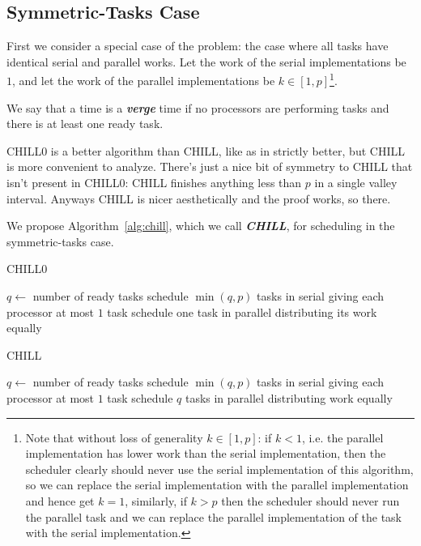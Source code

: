 \documentclass[twocolumn]{article}[11pt]
\newcommand{\defn}[1]{{\textit{\textbf{\boldmath #1}}}\xspace}
\begin{document}
\subsection{Symmetric-Tasks Case}
\label{subsec:symmetrictasks}
First we consider a special case of the problem: the case where
all tasks have identical serial and parallel works. Let
the work of the serial implementations be $1$, and let the work
of the parallel implementations be $k \in [1, p]$\footnote{Note that
without loss of generality $k \in [1,p]$: if $k < 1$, i.e. the
parallel implementation has lower work than the serial
implementation, then the scheduler clearly should never use the serial
implementation of this algorithm, so we can replace the serial
implementation with the parallel implementation and hence get
$k=1$, similarly, if $k > p$ then the scheduler should never run
the parallel task and we can replace the parallel implementation
of the task with the serial implementation.}.

We say that a time is a \defn{verge} time if no processors are
performing tasks and there is at least one ready task.

{\color{red}
  CHILL0 is a better algorithm than CHILL, like as in strictly
  better, but CHILL is more convenient to analyze. There's just a
  nice bit of symmetry to CHILL that isn't present in CHILL0:
  CHILL finishes anything less than $p$ in a single valley
  interval. Anyways CHILL is nicer aesthetically and the proof
  works, so there. 
}

We propose Algorithm~\ref{alg:chill}, which we call \defn{CHILL},
for scheduling in the symmetric-tasks case.

\begin{algorithm}
  \caption{CHILL0}
  \label{alg:chill0}
  \begin{algorithmic}
        \State $q \gets $ number of ready tasks
          \State schedule $\min(q, p)$ tasks in serial
          \State giving each processor at most $1$ task
        \Else
          \State schedule one task in parallel
          \State distributing its work equally 
        \EndIf
      \EndIf
    \EndWhile
  \end{algorithmic}
\end{algorithm}

\begin{algorithm}
  \caption{CHILL}
  \label{alg:chill}
  \begin{algorithmic}
        \State $q \gets $ number of ready tasks
          \State schedule $\min(q, p)$ tasks in serial
          \State giving each processor at most $1$ task
        \Else
          \State schedule $q$ tasks in parallel
          \State distributing work equally 
        \EndIf
      \EndIf
    \EndWhile
  \end{algorithmic}
\end{algorithm}
\end{document}
